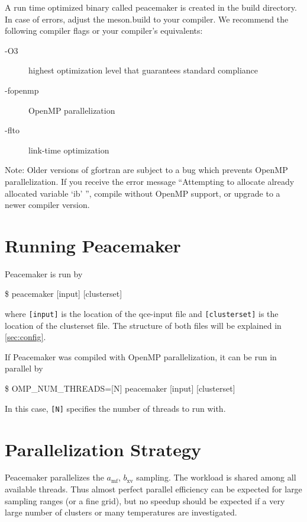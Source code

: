 \documentclass{scrartcl}
\newcommand{\amf}{a_\mathrm{mf}}
\newcommand{\bxv}{b_\mathrm{xv}}
\begin{document}
A run time optimized binary called peacemaker is created in the build directory.
In case of errors, adjust the meson.build to your compiler.
We recommend the following compiler flags or your compiler's equivalents:
\begin{addmargin}[1cm]{0cm}
    \begin{description}
        \item[-O3] highest optimization level that guarantees standard compliance
        \item[-fopenmp] OpenMP parallelization
        \item[-flto] link-time optimization
    \end{description}
\end{addmargin}

Note: Older versions of gfortran are subject to a bug which prevents OpenMP parallelization.
If you receive the error message ``Attempting to allocate already allocated variable `ib' '', compile without OpenMP support, or upgrade to a newer compiler version.


\newpage
\section{Running Peacemaker}

Peacemaker is run by
\begin{addmargin}[1cm]{0cm}
    \ttfamily
    \$ peacemaker [input] [clusterset]
\end{addmargin}
where \texttt{[input]} is the location of the qce-input file and \texttt{[clusterset]} is the location of the clusterset file.
The structure of both files will be explained in \cref{sec:config}.

If Peacemaker was compiled with OpenMP parallelization, it can be run in parallel by
\begin{addmargin}[1cm]{0cm}
    \ttfamily
    \$ OMP\_NUM\_THREADS=[N] peacemaker [input] [clusterset]
\end{addmargin}
In this case, \texttt{[N]} specifies the number of threads to run with.

\section{Parallelization Strategy}

Peacemaker parallelizes the $\amf$, $\bxv$ sampling.
The workload is shared among all available threads.
Thus almost perfect parallel efficiency can be expected for large sampling ranges (or a fine grid), but no speedup should be expected
if a very large number of clusters or many temperatures are investigated.
\end{document}
